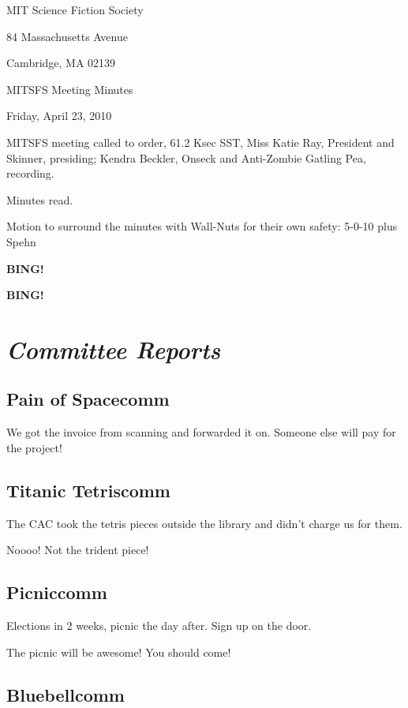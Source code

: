 \documentclass[10pt]{article}
\newcommand{\bing}{{\bf BING!} }
\newcommand{\goto}[1]{\bing \vskip 12pt \section*{{\em{#1}}}}
\newcommand{\ps}{ plus Spehn\xspace}
\newcommand{\skinner}{Miss Katie Ray, President and Skinner}
\newcommand{\onseck}{Kendra Beckler, Onseck and Anti-Zombie Gatling Pea}
\newcommand{\meetingdate}{Friday, April 23, 2010}
\begin{document}
\begin{center}

MIT Science Fiction Society

84 Massachusetts Avenue

Cambridge, MA 02139

\vspace{12pt}

MITSFS Meeting Minutes

\meetingdate

\end{center}

\vspace{18pt}

\setlength{\parskip}{6pt}

\noindent
MITSFS meeting called to order, 61.2 Ksec SST,
\skinner, presiding; \onseck, recording.

Minutes read.

Motion to surround the minutes with Wall-Nuts for their own safety: 5-0-10 \ps

\bing

\goto{Committee Reports}

\subsection*{Pain of Spacecomm}

We got the invoice from scanning and forwarded it on.  Someone else will pay for the project!

\subsection*{Titanic Tetriscomm}

The CAC took the tetris pieces outside the library and didn't charge us for them.

Noooo!  Not the trident piece!

\subsection*{Picniccomm}

Elections in 2 weeks, picnic the day after.  Sign up on the door.

The picnic will be awesome!  You should come!

\subsection*{Bluebellcomm}
\end{document}

